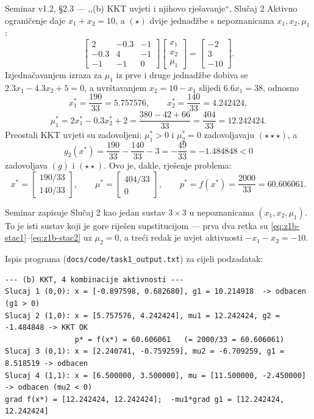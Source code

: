 \begin{seminar}{Seminar v1.2, §2.3 --- ,,(b) KKT uvjeti i njihovo rješavanje``, Slučaj 2}
Aktivno ograničenje daje $x_1 + x_2 = 10$, a $(\star)$ dvije jednadžbe s
nepoznanicama $x_1, x_2, \mu_1$:
\[
\begin{bmatrix} 2 & -0.3 & -1 \\ -0.3 & 4 & -1 \\ -1 & -1 & 0 \end{bmatrix}
\begin{bmatrix} x_1 \\ x_2 \\ \mu_1 \end{bmatrix}
= \begin{bmatrix} -2 \\ 3 \\ -10 \end{bmatrix}.
\]
Izjednačavanjem izraza za $\mu_1$ iz prve i druge jednadžbe dobiva se
$2.3x_1 - 4.3x_2 + 5 = 0$, a uvrštavanjem $x_2 = 10 - x_1$ slijedi $6.6 x_1 = 38$,
odnosno
\[
x_1^* = \frac{190}{33} = 5.757576, \qquad x_2^* = \frac{140}{33} = 4.242424,
\]
\[
\mu_1^* = 2x_1^* - 0.3x_2^* + 2 = \frac{380 - 42 + 66}{33} = \frac{404}{33} = 12.242424.
\]
Preostali KKT uvjeti su zadovoljeni: $\mu_1^* > 0$ i $\mu_2^* = 0$ zadovoljavaju
$(\star\star\star)$, a
\[
g_2(x^*) = \frac{190}{33} - \frac{140}{33} - 3 = -\frac{49}{33} = -1.484848 < 0
\]
zadovoljava $(g)$ i $(\star\star)$. Ovo je, dakle, rješenje problema:
\[
x^* = \begin{bmatrix} 190/33 \\ 140/33 \end{bmatrix}, \qquad
\mu^* = \begin{bmatrix} 404/33 \\ 0 \end{bmatrix}, \qquad
p^* = f(x^*) = \frac{2000}{33} = 60.606061.
\]
\end{seminar}

Seminar zapisuje Slučaj 2 kao jedan sustav $3\times3$ u nepoznanicama
$(x_1, x_2, \mu_1)$. To je isti sustav koji je gore riješen supstitucijom ---
prva dva retka su \eqref{eq:z1b-stac1}--\eqref{eq:z1b-stac2} uz $\mu_2 = 0$, a
treći redak je uvjet aktivnosti $-x_1 - x_2 = -10$.

Ispis programa (\texttt{docs/code/\allowbreak task1\_output.txt}) za cijeli podzadatak:

\begin{lstlisting}[style=outputstyle]
--- (b) KKT, 4 kombinacije aktivnosti ---
Slucaj 1 (0,0): x = [-0.897598, 0.682680], g1 = 10.214918  -> odbacen (g1 > 0)
Slucaj 2 (1,0): x = [5.757576, 4.242424], mu1 = 12.242424, g2 = -1.484848 -> KKT OK
                p* = f(x*) = 60.606061   (= 2000/33 = 60.606061)
Slucaj 3 (0,1): x = [2.240741, -0.759259], mu2 = -6.709259, g1 = 8.518519 -> odbacen
Slucaj 4 (1,1): x = [6.500000, 3.500000], mu = [11.500000, -2.450000] -> odbacen (mu2 < 0)
grad f(x*) = [12.242424, 12.242424];  -mu1*grad g1 = [12.242424, 12.242424]
\end{lstlisting}

